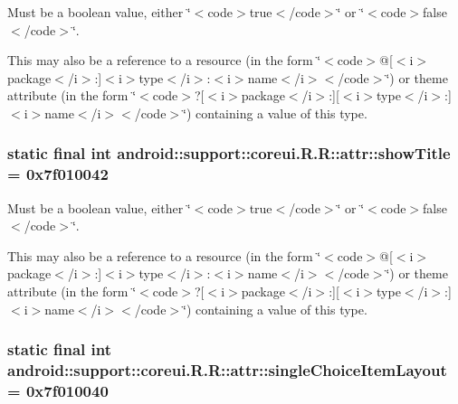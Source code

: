 Must be a boolean value, either \char`\"{}$<$code$>$true$<$/code$>$\char`\"{} or \char`\"{}$<$code$>$false$<$/code$>$\char`\"{}. 

This may also be a reference to a resource (in the form \char`\"{}$<$code$>$@\mbox{[}$<$i$>$package$<$/i$>$:\mbox{]}$<$i$>$type$<$/i$>$:$<$i$>$name$<$/i$>$$<$/code$>$\char`\"{}) or theme attribute (in the form \char`\"{}$<$code$>$?\mbox{[}$<$i$>$package$<$/i$>$:\mbox{]}\mbox{[}$<$i$>$type$<$/i$>$:\mbox{]}$<$i$>$name$<$/i$>$$<$/code$>$\char`\"{}) containing a value of this type. \hypertarget{classandroid_1_1support_1_1coreui_1_1_r_1_1attr_07d1d4c93e3e662a10d5207a7e3da2c0}{
\subsubsection[{showTitle}]{\setlength{\rightskip}{0pt plus 5cm}static final int android::support::coreui.R.R::attr::showTitle = 0x7f010042}}
\label{classandroid_1_1support_1_1coreui_1_1_r_1_1attr_07d1d4c93e3e662a10d5207a7e3da2c0}


Must be a boolean value, either \char`\"{}$<$code$>$true$<$/code$>$\char`\"{} or \char`\"{}$<$code$>$false$<$/code$>$\char`\"{}. 

This may also be a reference to a resource (in the form \char`\"{}$<$code$>$@\mbox{[}$<$i$>$package$<$/i$>$:\mbox{]}$<$i$>$type$<$/i$>$:$<$i$>$name$<$/i$>$$<$/code$>$\char`\"{}) or theme attribute (in the form \char`\"{}$<$code$>$?\mbox{[}$<$i$>$package$<$/i$>$:\mbox{]}\mbox{[}$<$i$>$type$<$/i$>$:\mbox{]}$<$i$>$name$<$/i$>$$<$/code$>$\char`\"{}) containing a value of this type. \hypertarget{classandroid_1_1support_1_1coreui_1_1_r_1_1attr_e41c4f588ec999034523c0be41e818ca}{
\subsubsection[{singleChoiceItemLayout}]{\setlength{\rightskip}{0pt plus 5cm}static final int android::support::coreui.R.R::attr::singleChoiceItemLayout = 0x7f010040}}
\label{classandroid_1_1support_1_1coreui_1_1_r_1_1attr_e41c4f588ec999034523c0be41e818ca}


